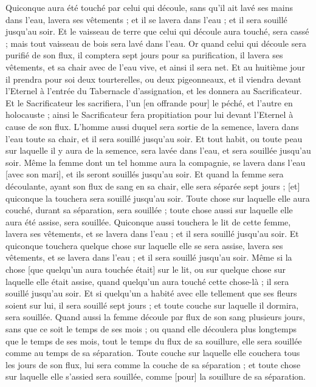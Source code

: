 \begin{multicols}{2}
Quiconque aura été touché par celui qui découle, sans qu'il ait lavé ses mains dans l'eau, lavera ses vêtements ; et il se lavera dans l'eau ; et il sera souillé jusqu'au soir.
Et le vaisseau de terre que celui qui découle aura touché, sera cassé ; mais tout vaisseau de bois sera lavé dans l'eau.
Or quand celui qui découle sera purifié de son flux, il comptera sept jours pour sa purification, il lavera ses vêtements, et sa chair avec de l'eau vive, et ainsi il sera net.
Et au huitième jour il prendra pour soi deux tourterelles, ou deux pigeonneaux, et il viendra devant l'Eternel à l'entrée du Tabernacle d'assignation, et les donnera au Sacrificateur.
Et le Sacrificateur les sacrifiera, l'un [en offrande pour] le péché, et l'autre en holocauste ; ainsi le Sacrificateur fera propitiation pour lui devant l'Eternel à cause de son flux.
L'homme aussi duquel sera sortie de la semence, lavera dans l'eau toute sa chair, et il sera souillé jusqu'au soir.
Et tout habit, ou toute peau sur laquelle il y aura de la semence, sera lavée dans l'eau, et sera souillée jusqu'au soir.
Même la femme dont un tel homme aura la compagnie, se lavera dans l'eau [avec son mari], et ils seront souillés jusqu'au soir.
Et quand la femme sera découlante, ayant son flux de sang en sa chair, elle sera séparée sept jours ; [et] quiconque la touchera sera souillé jusqu'au soir.
Toute chose sur laquelle elle aura couché, durant sa séparation, sera souillée ; toute chose aussi sur laquelle elle aura été assise, sera souillée.
Quiconque aussi touchera le lit de cette femme, lavera ses vêtements, et se lavera dans l'eau ; et il sera souillé jusqu'au soir.
Et quiconque touchera quelque chose sur laquelle elle se sera assise, lavera ses vêtements, et se lavera dans l'eau ; et il sera souillé jusqu'au soir.
Même si la chose [que quelqu'un aura touchée était] sur le lit, ou sur quelque chose sur laquelle elle était assise, quand quelqu'un aura touché cette chose-là ; il sera souillé jusqu'au soir.
Et si quelqu'un a habité avec elle tellement que ses fleurs soient sur lui, il sera souillé sept jours ; et toute couche sur laquelle il dormira, sera souillée.
Quand aussi la femme découle par flux de son sang plusieurs jours, sans que ce soit le temps de ses mois ; ou quand elle découlera plus longtemps que le temps de ses mois, tout le temps du flux de sa souillure, elle sera souillée comme au temps de sa séparation.
Toute couche sur laquelle elle couchera tous les jours de son flux, lui sera comme la couche de sa séparation ; et toute chose sur laquelle elle s'assied sera souillée, comme [pour] la souillure de sa séparation.

\end{multicols}
